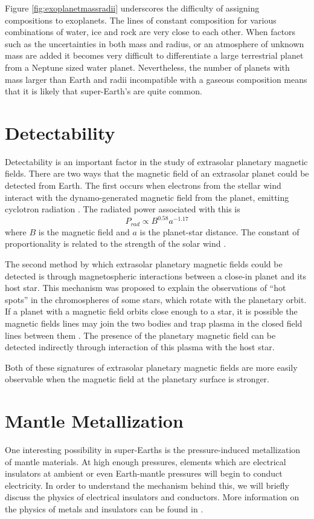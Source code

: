 Figure \ref{fig:exoplanetmassradii} underscores the difficulty of assigning compositions to exoplanets. The lines of constant composition for various combinations of water, ice and rock are very close to each other. When factors such as the uncertainties in both mass and radius, or an atmosphere of unknown mass \citep{adams2008} are added it becomes very difficult to differentiate a large terrestrial planet from a Neptune sized water planet. Nevertheless, the number of planets with mass larger than Earth and radii incompatible with a gaseous composition means that it is likely that super-Earth's are quite common.

\section{Detectability}
Detectability is an important factor in the study of extrasolar planetary magnetic fields. There are two ways that the magnetic field of an extrasolar planet could be detected from Earth. The first occurs when electrons from the stellar wind interact with the dynamo-generated magnetic field from the planet, emitting cyclotron radiation \citep{farrell1999, griessmeier2007, lecacheux1991}. The radiated power associated with this is 
\begin{equation}
P_{rad}\propto B^{0.58} a^{-1.17}
\end{equation}
where $B$ is the magnetic field and $a$ is the planet-star distance. The constant of proportionality is related to the strength of the solar wind \citep{farrell1999}.

The second method by which extrasolar planetary magnetic fields could be detected is through magnetospheric interactions between a close-in planet and its host star. This mechanism was proposed to explain the observations of ``hot spots'' in the chromospheres of some stars, which rotate with the planetary orbit. If a planet with a magnetic field orbits close enough to a star, it is possible the magnetic fields lines may join the two bodies and trap plasma in the closed field lines between them \citep{cohen2009}. The presence of the planetary magnetic field can be detected indirectly through interaction of this plasma with the host star.

Both of these signatures of extrasolar planetary magnetic fields are more easily observable when the magnetic field at the planetary surface is stronger.

\section{Mantle Metallization}
One interesting possibility in super-Earths is the pressure-induced metallization of mantle materials. At high enough pressures, elements which are electrical insulators at ambient or even Earth-mantle pressures will begin to conduct electricity. In order to understand the mechanism behind this, we will briefly discuss the physics of electrical insulators and conductors. More information on the physics of metals and insulators can be found in \citet{ashcroftandmermin}.

